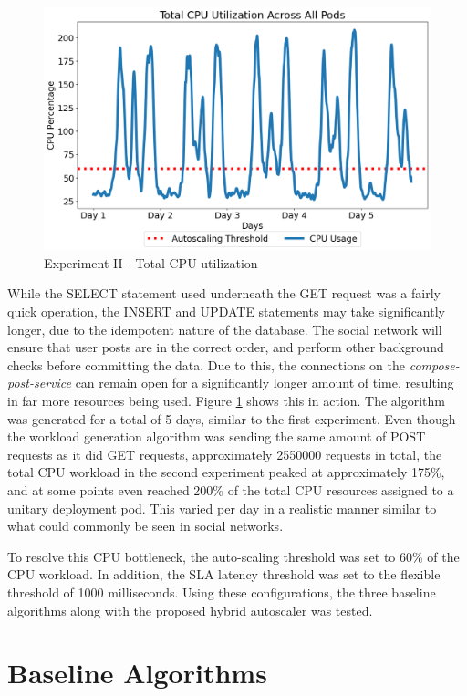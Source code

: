 \begin{figure}[htb]
    \centering
    \caption{Experiment II - Total CPU utilization}
    \label{fig:exp2-workload}
    \includegraphics[width=0.6\linewidth]{Figures/POST-Total-CPU.png}
\end{figure}

While the SELECT statement used underneath the GET request was a fairly quick operation, the INSERT and UPDATE statements may take significantly longer, due to the idempotent nature of the database. The social network will ensure that user posts are in the correct order, and perform other background checks before committing the data. Due to this, the connections on the \textit{compose-post-service} can remain open for a significantly longer amount of time, resulting in far more resources being used. Figure \ref{fig:exp2-workload} shows this in action. The algorithm was generated for a total of 5 days, similar to the first experiment. Even though the workload generation algorithm was sending the same amount of POST requests as it did GET requests, approximately \num[group-separator={,}]{2550000} requests in total, the total CPU workload in the second experiment peaked at approximately 175\%, and at some points even reached 200\% of the total CPU resources assigned to a unitary deployment pod. This varied per day in a realistic manner similar to what could commonly be seen in social networks.\par

To resolve this CPU bottleneck, the auto-scaling threshold was set to 60\% of the CPU workload. In addition, the SLA latency threshold was set to the flexible threshold of 1000 milliseconds. Using these configurations, the three baseline algorithms along with the proposed hybrid autoscaler was tested.\par

\section{Baseline Algorithms}
\label{sec:ch5-baseline-algos}

